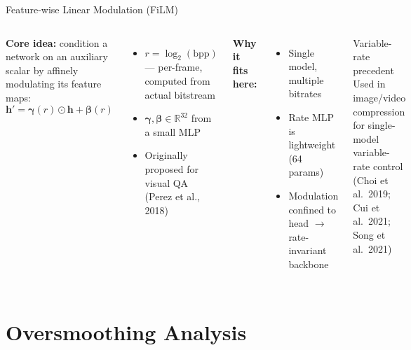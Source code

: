 \documentclass[aspectratio=169]{beamer}
\begin{document}
\begin{frame}{Feature-wise Linear Modulation (FiLM)}
  \begin{columns}[T]
    \textbf{Core idea:} condition a network on an auxiliary scalar by affinely
    modulating its feature maps:
    \[
      \mathbf{h}' = \boldsymbol{\gamma}(r) \odot \mathbf{h} + \boldsymbol{\beta}(r)
    \]
    \begin{itemize}
      \item $r = \log_2(\mathrm{bpp})$ — per-frame, computed from actual bitstream
      \item $\boldsymbol{\gamma}, \boldsymbol{\beta} \in \mathbb{R}^{32}$ from a small MLP
      \item Originally proposed for visual QA (Perez et al., 2018)
    \end{itemize}
    \vspace{6pt}
    \textbf{Why it fits here:}
    \begin{itemize}
      \item Single model, multiple bitrates
      \item Rate MLP is lightweight (64 params)
      \item Modulation confined to head $\to$ rate-invariant backbone
    \end{itemize}

    \begin{block}{Variable-rate precedent}
      \small
      Used in image/video compression for single-model variable-rate control
      (Choi et al.\ 2019; Cui et al.\ 2021; Song et al.\ 2021)
    \end{block}
  \end{columns}
\end{frame}

\section{Oversmoothing Analysis}
\end{document}
